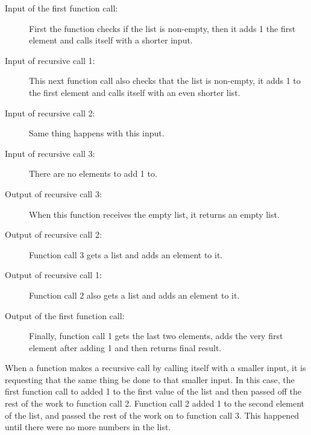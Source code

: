 \documentclass[11pt]{cselabheader}
\begin{document}
\begin{description}
\item[Input of the first function call:] \pythoninline{[1, 2, 3]}

First the function checks if the list is non-empty, then it adds 1 the
first element and calls itself with a shorter input.

\item[Input of recursive call 1:] \pythoninline{[2, 3]}

This next function call also checks that the list is non-empty, it adds 1
to the first element and calls itself with an even shorter list.

\item[Input of recursive call 2:] \pythoninline{[3]}

Same thing happens with this input.

\item[Input of recursive call 3:] \pythoninline{[]}

There are no elements to add 1 to.

\item[Output of recursive call 3:] \pythoninline{[]}

When this function receives the empty list, it returns an empty list.

\item[Output of recursive call 2:] \pythoninline{[3 + 1] + []}

Function call 3 gets a list and adds an element to it.

\item[Output of recursive call 1:] \pythoninline{[2 + 1] + [3 + 1] + []}

Function call 2 also gets a list and adds an element to it.

\item[Output of the first function call:] \pythoninline{[3 + 1] + [2 + 1] + [3 + 1] + [] = [4, 3, 2]}

Finally, function call 1 gets the last two elements, adds the very
first element after adding 1 and then returns final result.
\end{description}

When a function makes a recursive call by calling itself with a smaller input,
it is requesting that the same thing be done to that smaller input.
In this case, the first function call to  added 1 to the
first value of the list and then passed off the rest of the work to
function call 2. Function call 2 added 1 to the second element of the list,
and passed the rest of the work on to function call 3. This happened until
there were no more numbers in the list.
\end{document}
